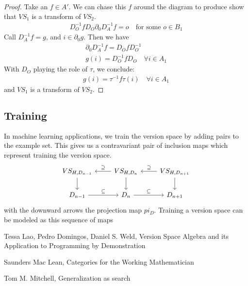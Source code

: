 \documentclass{article}
\theoremstyle{definition}
\begin{document}
\begin{proof}
Take an $f\in A'$. We can chase this $f$ around the diagram to produce show that $VS_1$ is a transform of $VS_2$. 
\begin{gather*}
    D_O^{-1} f D_O \partial_0 D_{A}^{-1} f = o \quad \text{for some $o \in B_1$}
\end{gather*}
Call $D^{-1}_A f = g$, and $i \in \partial_0 g$. Then we have 
\begin{gather*}
    \partial_0 D_A^{-1} f = D_O f D_O^{-1} \\
    g(i) = D_O^{-1} f D_O \quad \forall i \in A_1 
\end{gather*}
With $D_O$ playing the role of $\tau$, we conclude: 
\begin{gather*}
    g(i) = \tau^{-1} f \tau(i) \quad \forall i \in A_1
\end{gather*}
and $VS_1$ is a transform of $VS_2$. 
\end{proof}

\subsection{Training}
In machine learning applications, we train the version space by adding pairs to the example set. This gives us a contravariant pair of inclusion maps which represent training the version space. 
\[\begin{tikzcd}
	{VS_{H,D_{n-1}}} & {VS_{H,D_n}} & {VS_{H,D_{n+1}}} \\
	{D_{n-1}} & {D_n} & {D_{n+1}}
	\arrow["\supseteq"', from=1-3, to=1-2]
	\arrow["\subseteq", from=2-2, to=2-3]
	\arrow[from=1-2, to=2-2]
	\arrow[from=1-3, to=2-3]
	\arrow["\supseteq"', from=1-2, to=1-1]
	\arrow["\subseteq", from=2-1, to=2-2]
	\arrow[from=1-1, to=2-1]
\end{tikzcd}\]
with the downward arrows the projection map $pi_D$. Training a version space can be modeled as this sequence of maps
\begin{thebibliography}{9}
Tessa Lao, Pedro Domingos, Daniel S. Weld, Version Space Algebra and its Application to Programming by Demonstration

Saunders Mac Lean, Categories for the Working Mathematician

Tom M. Mitchell, Generalization as search
\end{thebibliography}
\end{document}
